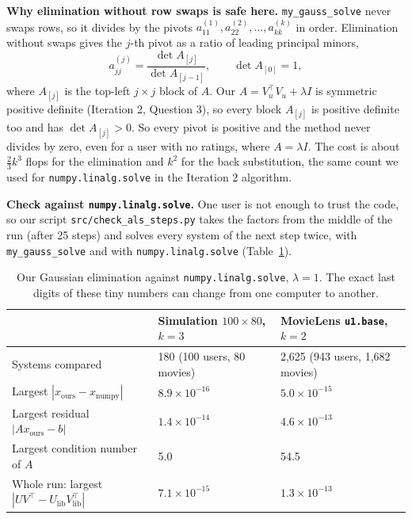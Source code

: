 \textbf{Why elimination without row swaps is safe here.} \texttt{my\_gauss\_solve} never swaps rows, so it divides by the pivots $a_{11}^{(1)}, a_{22}^{(2)}, \dots, a_{kk}^{(k)}$ in order. Elimination without swaps gives the $j$-th pivot as a ratio of leading principal minors,
\[
a_{jj}^{(j)} = \frac{\det A_{[j]}}{\det A_{[j-1]}}, \qquad \det A_{[0]} = 1,
\]
where $A_{[j]}$ is the top-left $j \times j$ block of $A$. Our $A = V_u^\top V_u + \lambda I$ is symmetric positive definite (Iteration 2, Question 3), so every block $A_{[j]}$ is positive definite too and has $\det A_{[j]} > 0$. So every pivot is positive and the method never divides by zero, even for a user with no ratings, where $A = \lambda I$. The cost is about $\tfrac{2}{3}k^3$ flops for the elimination and $k^2$ for the back substitution, the same count we used for \texttt{numpy.linalg.solve} in the Iteration 2 algorithm.

\begin{sloppypar}\textbf{Check against \texttt{numpy.linalg.solve}.} One user is not enough to trust the code, so our script \texttt{src/check\_als\_steps.py} takes the factors from the middle of the run (after 25 steps) and solves every system of the next step twice, with \texttt{my\_gauss\_solve} and with \texttt{numpy.linalg.solve} (Table~\ref{tab:q2}).\end{sloppypar}

\begin{table}[h]
\centering
\small
\begin{tabular}{lll}
\hline
 & Simulation $100 \times 80$, $k = 3$ & MovieLens \texttt{u1.base}, $k = 2$ \\
\hline
Systems compared & 180 (100 users, 80 movies) & 2{,}625 (943 users, 1{,}682 movies) \\
Largest $|x_{\text{ours}} - x_{\text{numpy}}|$ & $8.9\times10^{-16}$ & $5.0\times10^{-15}$ \\
Largest residual $|Ax_{\text{ours}} - b|$ & $1.4\times10^{-14}$ & $4.6\times10^{-13}$ \\
Largest condition number of $A$ & 5.0 & 54.5 \\
Whole run: largest $|UV^\top - U_{\text{lib}}V_{\text{lib}}^\top|$ & $7.1\times10^{-15}$ & $1.3\times10^{-13}$ \\
\hline
\end{tabular}
\caption{Our Gaussian elimination against \texttt{numpy.linalg.solve}, $\lambda = 1$. The exact last digits of these tiny numbers can change from one computer to another.}
\label{tab:q2}
\end{table}

